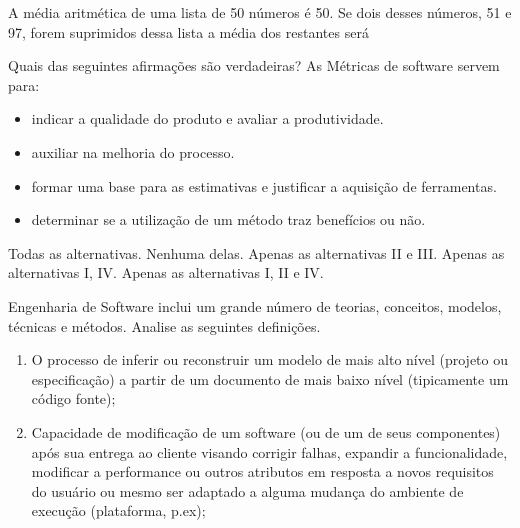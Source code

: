\documentclass[12pt, addpoints]{exam}
\begin{document}
\begin{questions}
\question

A média aritmética de uma lista de 50 números é 50. Se dois desses números, 51 e 97, forem suprimidos dessa lista a média dos restantes será


\begin{choices}
\end{choices}

\question

Quais das seguintes afirmações são verdadeiras? As Métricas de software servem para:



\begin{itemize}

    \item[I)] indicar a qualidade do produto e avaliar a produtividade.

    \item[II)] auxiliar na melhoria do processo.

    \item[III)] formar uma base para as estimativas e justificar a aquisição de ferramentas.

    \item[IV)] determinar se a utilização de um método traz benefícios ou não.

\end{itemize}
\begin{choices}
\choice Todas as alternativas.
\choice Nenhuma delas.
\choice Apenas as alternativas II e III.
\choice Apenas as alternativas I, IV.
\choice Apenas as alternativas I, II e IV.
\end{choices}

\question

Engenharia de Software inclui um grande número de teorias, conceitos, modelos, técnicas e métodos. Analise as seguintes definições.

\begin{enumerate}[label=\Roman*.]

    \item O processo de inferir ou reconstruir um modelo de mais alto nível (projeto ou especificação) a partir de um documento de mais baixo nível (tipicamente um código fonte);

    \item Capacidade de modificação de um software (ou de um de seus componentes) após sua entrega ao cliente visando corrigir falhas, expandir a funcionalidade, modificar a performance ou outros atributos em resposta a novos requisitos do usuário ou mesmo ser adaptado a alguma mudança do ambiente de execução (plataforma, p.ex);


\end{enumerate}
\end{questions}
\end{document}
